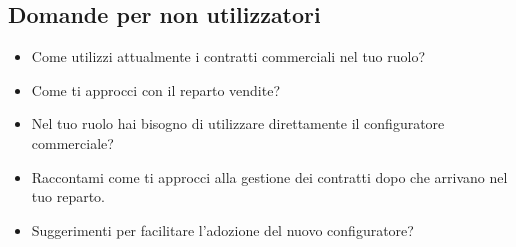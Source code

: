 \documentclass[12pt, a4paper]{article} %
\begin{document}
\subsection{Domande per non utilizzatori}
\begin{itemize}
    \item Come utilizzi attualmente i contratti commerciali nel tuo ruolo?
    \item Come ti approcci con il reparto vendite?
    \item Nel tuo ruolo hai bisogno di utilizzare direttamente il configuratore
          commerciale?
    \item Raccontami come ti approcci alla gestione dei contratti dopo che arrivano nel
          tuo reparto.
    \item Suggerimenti per facilitare l'adozione del nuovo configuratore?
\end{itemize}\label{NonVendorQuestions}
\end{document}
